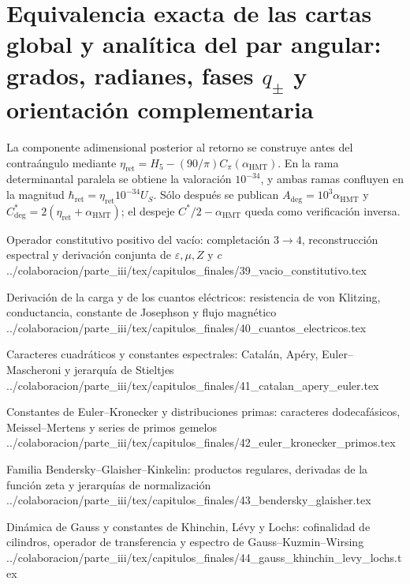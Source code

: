 \chapter{Equivalencia exacta de las cartas global y analítica del par angular: grados, radianes, fases \texorpdfstring{\(q_{\pm}\)}{q+/-} y orientación complementaria}
\label{chap:p3-final:38:angulo_contraangulo}
La componente adimensional posterior al retorno se construye antes del
contraángulo mediante
\(\eta_{\mathrm{ret}}=H_5-(90/\pi)C_\pi(\alpha_{\mathrm{HMT}})\).
En la rama determinantal paralela se obtiene la valoración \(10^{-34}\), y
ambas ramas confluyen en la magnitud
\(\hbar_{\mathrm{ret}}=\eta_{\mathrm{ret}}10^{-34}U_S\).
Sólo después se publican
\(A_{\mathrm{deg}}=10^3\alpha_{\mathrm{HMT}}\) y
\(C^*_{\mathrm{deg}}=2(\eta_{\mathrm{ret}}+\alpha_{\mathrm{HMT}})\);
el despeje \(C^*/2-\alpha_{\mathrm{HMT}}\) queda como verificación inversa.


\HMTFlushCurrentChapter
\HMTSuccessorChapterInput
  {Operador constitutivo positivo del vacío: completación \(3\to4\), reconstrucción espectral y derivación conjunta de \texorpdfstring{\(\varepsilon,\mu,Z\)}{epsilon, mu, Z} y \(c\)}
  {../colaboracion/parte_iii/tex/capitulos_finales/39_vacio_constitutivo.tex}

\HMTFlushCurrentChapter
\HMTSuccessorChapterInput
  {Derivación de la carga y de los cuantos eléctricos: resistencia de von Klitzing, conductancia, constante de Josephson y flujo magnético}
  {../colaboracion/parte_iii/tex/capitulos_finales/40_cuantos_electricos.tex}

\HMTFlushCurrentChapter
\HMTSuccessorChapterInput
  {Caracteres cuadráticos y constantes espectrales: Catalán, Apéry, Euler--Mascheroni y jerarquía de Stieltjes}
  {../colaboracion/parte_iii/tex/capitulos_finales/41_catalan_apery_euler.tex}

\HMTFlushCurrentChapter
\HMTSuccessorChapterInput
  {Constantes de Euler--Kronecker y distribuciones primas: caracteres dodecafásicos, Meissel--Mertens y series de primos gemelos}
  {../colaboracion/parte_iii/tex/capitulos_finales/42_euler_kronecker_primos.tex}

\HMTFlushCurrentChapter
\HMTSuccessorChapterInput
  {Familia Bendersky--Glaisher--Kinkelin: productos regulares, derivadas de la función zeta y jerarquías de normalización}
  {../colaboracion/parte_iii/tex/capitulos_finales/43_bendersky_glaisher.tex}

\HMTFlushCurrentChapter
\HMTSuccessorChapterInput
  {Dinámica de Gauss y constantes de Khinchin, Lévy y Lochs: cofinalidad de cilindros, operador de transferencia y espectro de Gauss--Kuzmin--Wirsing}
  {../colaboracion/parte_iii/tex/capitulos_finales/44_gauss_khinchin_levy_lochs.tex}

